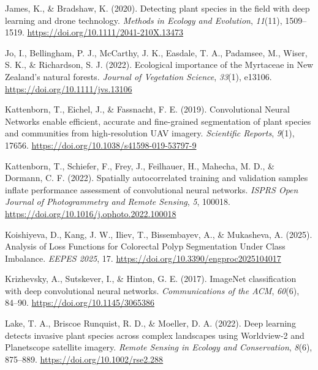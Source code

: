 \documentclass[
]{scrreprt}
\newlength{\cslhangindent}
\newenvironment{CSLReferences}[2] %
 {\begin{list}{}{%
  \setlength{\itemindent}{0pt}
  \setlength{\leftmargin}{0pt}
  \setlength{\parsep}{0pt}
  \setlength{\baselineskip}{12pt}
  \ifodd #1
   \setlength{\leftmargin}{\cslhangindent}
   \setlength{\itemindent}{-1\cslhangindent}
  \fi
  \setlength{\itemsep}{4pt}}}
 {\end{list}}
\begin{document}
\begin{CSLReferences}{1}{0}
James, K., \& Bradshaw, K. (2020). Detecting plant species in the field
with deep learning and drone technology. \emph{Methods in Ecology and
Evolution}, \emph{11}(11), 1509--1519.
\url{https://doi.org/10.1111/2041-210X.13473}

Jo, I., Bellingham, P. J., McCarthy, J. K., Easdale, T. A., Padamsee,
M., Wiser, S. K., \& Richardson, S. J. (2022). Ecological importance of
the {Myrtaceae} in {New Zealand}'s natural forests. \emph{Journal of
Vegetation Science}, \emph{33}(1), e13106.
\url{https://doi.org/10.1111/jvs.13106}

Kattenborn, T., Eichel, J., \& Fassnacht, F. E. (2019). Convolutional
{Neural Networks} enable efficient, accurate and fine-grained
segmentation of plant species and communities from high-resolution {UAV}
imagery. \emph{Scientific Reports}, \emph{9}(1), 17656.
\url{https://doi.org/10.1038/s41598-019-53797-9}

Kattenborn, T., Schiefer, F., Frey, J., Feilhauer, H., Mahecha, M. D.,
\& Dormann, C. F. (2022). Spatially autocorrelated training and
validation samples inflate performance assessment of convolutional
neural networks. \emph{ISPRS Open Journal of Photogrammetry and Remote
Sensing}, \emph{5}, 100018.
\url{https://doi.org/10.1016/j.ophoto.2022.100018}

Koishiyeva, D., Kang, J. W., Iliev, T., Bissembayev, A., \& Mukasheva,
A. (2025). Analysis of {Loss Functions} for {Colorectal Polyp
Segmentation Under Class Imbalance}. \emph{{EEPES} 2025}, 17.
\url{https://doi.org/10.3390/engproc2025104017}

Krizhevsky, A., Sutskever, I., \& Hinton, G. E. (2017). {ImageNet}
classification with deep convolutional neural networks.
\emph{Communications of the ACM}, \emph{60}(6), 84--90.
\url{https://doi.org/10.1145/3065386}

Lake, T. A., Briscoe Runquist, R. D., \& Moeller, D. A. (2022). Deep
learning detects invasive plant species across complex landscapes using
{Worldview}-2 and {Planetscope} satellite imagery. \emph{Remote Sensing
in Ecology and Conservation}, \emph{8}(6), 875--889.
\url{https://doi.org/10.1002/rse2.288}


\end{CSLReferences}
\end{document}
